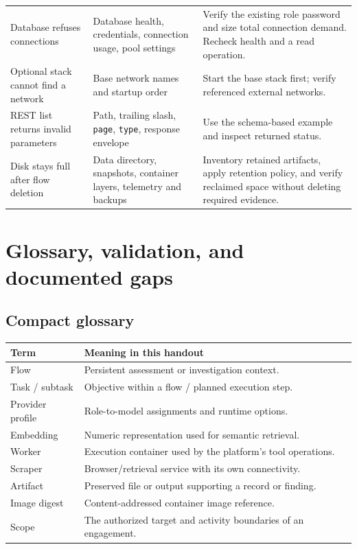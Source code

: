 \documentclass[11pt,letterpaper]{article}
\newcommand{\code}[1]{\nolinkurl{#1}}
\newcommand{\src}[1]{\cite{#1}}
\begin{document}
{\begin{longtable}{@{}L{0.22\textwidth}L{0.31\textwidth}L{0.41\textwidth}@{}}
Database refuses connections &
Database health, credentials, connection usage, pool settings &
Verify the existing role password and size total connection demand. Recheck
health and a read operation. \src{config,database}\\
Optional stack cannot find a network &
Base network names and startup order &
Start the base stack first; verify referenced external networks.
\src{langfuse,observability,graphiti}\\
REST list returns invalid parameters &
Path, trailing slash, \code{page}, \code{type}, response envelope &
Use the schema-based example and inspect returned status. \src{swagger}\\
Disk stays full after flow deletion &
Data directory, snapshots, container layers, telemetry and backups &
Inventory retained artifacts, apply retention policy, and verify reclaimed
space without deleting required evidence. \src{files}\\
\bottomrule
\end{longtable}}

\clearpage
\section{Glossary, validation, and documented gaps}
\subsection{Compact glossary}
\begin{tabularx}{\textwidth}{@{}L{0.23\textwidth}Y@{}}
\toprule
\textbf{Term} & \textbf{Meaning in this handout}\\
\midrule
Flow & Persistent assessment or investigation context.\\
Task / subtask & Objective within a flow / planned execution step.\\
Provider profile & Role-to-model assignments and runtime options.\\
Embedding & Numeric representation used for semantic retrieval.\\
Worker & Execution container used by the platform's tool operations.\\
Scraper & Browser/retrieval service with its own connectivity.\\
Artifact & Preserved file or output supporting a record or finding.\\
Image digest & Content-addressed container image reference.\\
Scope & The authorized target and activity boundaries of an engagement.\\
\bottomrule
\end{tabularx}
\end{document}
